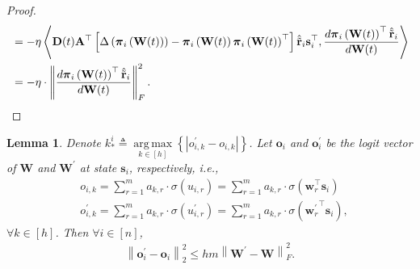 \documentclass[10pt]{article}
\def\rvo{{\mathbf{o}}}
\def\rvs{{\mathbf{s}}}
\def\rvw{{\mathbf{w}}}
\def\rvo{{\mathbf{o}}}
\def\rvtilder{{\tilde{\mathbf{r}}}}
\newtheorem{lem}{Lemma}
\def\rvpi{{\boldsymbol{\pi}}}
\def\rmA{{\mathbf{A}}}
\def\rmD{{\mathbf{D}}}
\def\rmW{{\mathbf{W}}}
\DeclareMathOperator*{\argmax}{arg\,max}
\begin{document}
\begin{proof}
\begin{equation*}
\begin{split}
    &= - \eta \left\langle \rmD(t) \rmA^\top \left[\Delta\left( \rvpi_i\left( \rmW(t) \right) \right) - \rvpi_i\left( \rmW(t) \right) \rvpi_i\left( \rmW(t) \right)^\top \right] \hat{\rvtilder}_i \rvs_i^\top, \frac{d \rvpi_i\left(\rmW(t)\right)^\top \hat{\rvtilder}_i}{d \rmW(t)} \right\rangle \\
    &= - \eta \cdot \left\| \frac{d \rvpi_i\left(\rmW(t)\right)^\top \hat{\rvtilder}_i}{d \rmW(t)} \right\|_F^2. \qedhere
\end{split}
\end{equation*}
\end{proof}

\begin{lem}
\label{lem:logit_upper_bound_parameter}
Denote $k_*^i \triangleq \argmax\limits_{k \in [h]}\left\{ \left| o_{i,k}^\prime - o_{i,k} \right| \right\}$. Let $\rvo_i$ and $\rvo_i^\prime$ be the logit vector of $\rmW$ and $\rmW^\prime$ at state $\rvs_i$, respectively, i.e.,
\begin{equation*}
\begin{split}
    &o_{i,k} = \sum\limits_{r=1}^{m}{ a_{k,r} \cdot \sigma\left( u_{i,r} \right)} = \sum\limits_{r=1}^{m}{ a_{k,r} \cdot \sigma\left(\rvw_r^\top \rvs_i \right)} \\
    &o_{i,k}^\prime = \sum\limits_{r=1}^{m}{ a_{k,r} \cdot \sigma\left( u_{i,r}^\prime \right)} = \sum\limits_{r=1}^{m}{ a_{k,r} \cdot \sigma\left({\rvw_r^\prime}^\top \rvs_i \right)},
\end{split}
\end{equation*}
$\forall k \in [h]$. Then $\forall i \in [n]$,
\begin{equation*}
\begin{split}
    \left\| \rvo_i^\prime - \rvo_i \right\|_2^2 \le h m \left\| \rmW^\prime - \rmW \right\|_F^2.
\end{split}
\end{equation*}
\end{lem}
\end{document}
